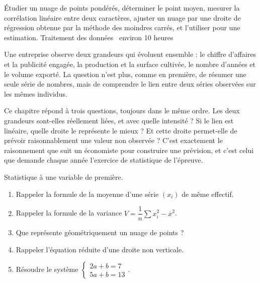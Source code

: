   {Étudier un nuage de points pondérés, déterminer le point moyen, mesurer la
   corrélation linéaire entre deux caractères, ajuster un nuage par une droite
   de régression obtenue par la méthode des moindres carrés, et l'utiliser
   pour une estimation.}
  {Traitement des données \textbullet\ environ 10 heures}

Une entreprise observe deux grandeurs qui évoluent ensemble : le chiffre
d'affaires et la publicité engagée, la production et la surface cultivée, le
nombre d'années et le volume exporté. La question n'est plus, comme en
première, de résumer une seule série de nombres, mais de comprendre le lien
entre deux séries observées sur les mêmes individus.

Ce chapitre répond à trois questions, toujours dans le même ordre. Les deux
grandeurs sont-elles réellement liées, et avec quelle intensité ? Si le lien
est linéaire, quelle droite le représente le mieux ? Et cette droite
permet-elle de prévoir raisonnablement une valeur non observée ? C'est
exactement le raisonnement que suit un économiste pour construire une
prévision, et c'est celui que demande chaque année l'exercice de statistique
de l'épreuve.

\begin{revision}
Statistique à une variable de première.

\begin{enumerate}[label=\textbf{\arabic*.}, leftmargin=*, itemsep=0.35em]
  \item Rappeler la formule de la moyenne d'une série $\left(x_{i}\right)$ de
        même effectif.
  \item Rappeler la formule de la variance
        $V = \dfrac{1}{n}\sum x_{i}^{2}-\overline{x}^{2}$.
  \item Que représente géométriquement un nuage de points ?
  \item Rappeler l'équation réduite d'une droite non verticale.
  \item Résoudre le système $\begin{cases} 2a+b = 7 \\ 5a+b = 13
        \end{cases}$.
\end{enumerate}
\end{revision}

